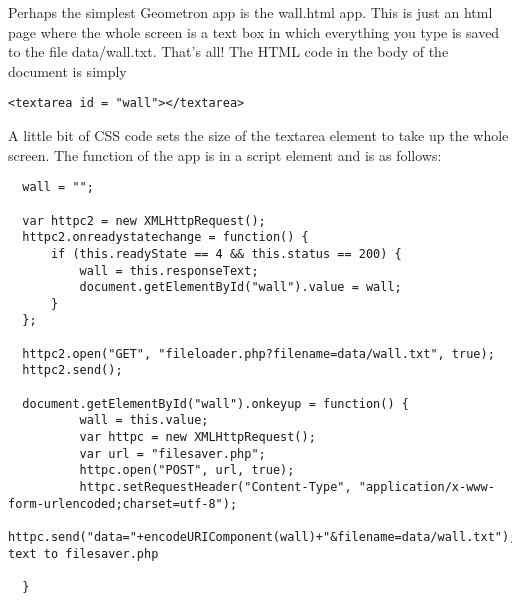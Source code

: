 Perhaps the simplest Geometron app is the wall.html app.  This is just an html page where the whole screen is a text box in which everything you type is saved to the file data/wall.txt.  That's all! The HTML code in the body of the document is simply 

\begin{verbatim}
<textarea id = "wall"></textarea>
\end{verbatim}

A little bit of CSS code sets the size of the textarea element to take up the whole screen. The function of the app is in a script element and is as follows:

\begin{verbatim}
  wall = "";

  var httpc2 = new XMLHttpRequest();
  httpc2.onreadystatechange = function() {
      if (this.readyState == 4 && this.status == 200) {
          wall = this.responseText;
          document.getElementById("wall").value = wall;
      }
  };
  
  httpc2.open("GET", "fileloader.php?filename=data/wall.txt", true);
  httpc2.send();
  
  document.getElementById("wall").onkeyup = function() {
          wall = this.value;
          var httpc = new XMLHttpRequest();
          var url = "filesaver.php";        
          httpc.open("POST", url, true);
          httpc.setRequestHeader("Content-Type", "application/x-www-form-urlencoded;charset=utf-8");
          httpc.send("data="+encodeURIComponent(wall)+"&filename=data/wall.txt");//send text to filesaver.php        
      
  }
\end{verbatim}